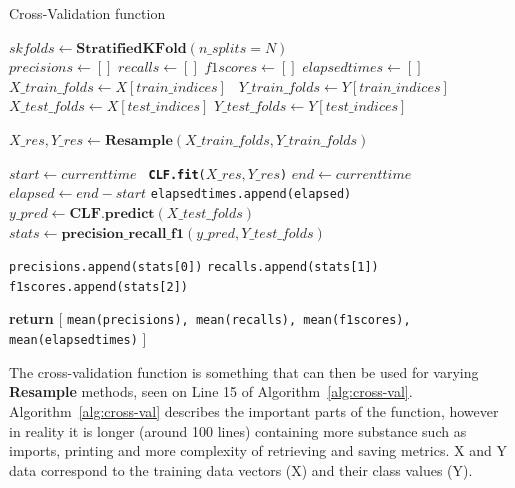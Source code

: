 \documentclass[12pt,a4paper,twoside]{report}
\begin{document}
\begin{algorithm}[!htbp]
\caption{Cross-Validation function }\label{alg:cross-val}
\begin{algorithmic}[1]

   \State $skfolds\gets \textbf{StratifiedKFold}(n\_splits = N)$\\
   
   \State $precisions\gets []$
   \State $recalls\gets []$
   \State $f1scores\gets []$
   \State $elapsedtimes\gets []$\\
   
        \State
         \texttt{\State $X\_train\_folds\gets X[train\_indices]$}
        \texttt{ \State $Y\_train\_folds\gets Y[train\_indices]$}
        \texttt{ \State $X\_test\_folds\gets X[test\_indices]$}
         \texttt{\State $Y\_test\_folds\gets Y[test\_indices]$}
         
         \texttt{\State $X\_res, Y\_res \gets \textbf{Resample}(X\_train\_folds,Y\_train\_folds)$}
         
          \texttt{\State $ start \gets current time$} 
          \texttt{ \State \textbf{CLF.fit}($X\_res, Y\_res$)} 
          \texttt{\State $ end \gets current time$} 
          \texttt{\State $ elapsed \gets end - start$} 
          \texttt{\State elapsedtimes.append(elapsed)} 
           \texttt{\State $y\_pred \gets \textbf{CLF.predict}(X\_test\_folds)$} 
          \texttt{\State $stats \gets \textbf{precision\_recall\_f1}(y\_pred, Y\_test\_folds )$} 
          
          \texttt{\State precisions.append(stats[0])}
          \texttt{\State recalls.append(stats[1])}  
          \texttt{\State f1scores.append(stats[2])} 
   \EndFor
   
   \State \textbf{return} [ \texttt{mean(precisions), mean(recalls), mean(f1scores), mean(elapsedtimes)} ]
   
\EndProcedure
\end{algorithmic}
\end{algorithm}

The cross-validation function is something that can then be used for varying \textbf{Resample} methods, seen on Line 15 of Algorithm~\ref{alg:cross-val}. Algorithm~\ref{alg:cross-val} describes the important parts of the function, however in reality it is longer (around 100 lines) containing more substance such as imports, printing and more complexity of retrieving and saving metrics. X and Y data correspond to the training data vectors (X) and their class values (Y). 
\end{document}

